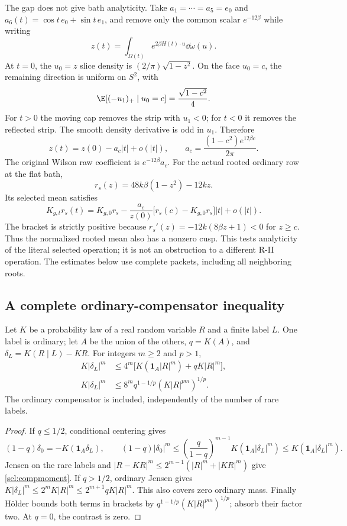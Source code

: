 The gap does not give bath analyticity. Take \(a_1=\cdots=a_5=e_0\) and \(a_6(t)=\cos t\,e_0+\sin t\,e_1\), and remove only the common scalar \(e^{-12\beta}\) while writing
\[
 z(t)=\int_{\Omega(t)}e^{2\beta H(t)\cdot u}\dd\omega(u).
\]
At \(t=0\), the \(u_0=z\) slice density is \((2/\pi)\sqrt{1-z^2}\). On the face \(u_0=c\), the remaining direction is uniform on \(S^2\), with
\[
 \E[(-u_1)_+\mid u_0=c]=\frac{\sqrt{1-c^2}}4.
\]
For \(t>0\) the moving cap removes the strip with \(u_1<0\); for \(t<0\) it removes the reflected strip. The smooth density derivative is odd in \(u_1\). Therefore
\begin{equation}
 z(t)=z(0)-a_c|t|+o(|t|),\qquad
 a_c=\frac{(1-c^2)e^{12\beta c}}{2\pi}.
 \label{sel:cusp}
\end{equation}
The original Wilson raw coefficient is \(e^{-12\beta}a_c\). For the actual rooted ordinary row at the flat bath,
\[
 r_s(z)=48k\beta(1-z^2)-12kz.
\]
Its selected mean satisfies
\begin{equation}
 K_{g,t}r_s(t)=K_{g,0}r_s
 -\frac{a_c}{z(0)}
       \bigl[r_s(c)-K_{g,0}r_s\bigr]|t|+o(|t|).
 \label{sel:meancusp}
\end{equation}
The bracket is strictly positive because \(r_s'(z)=-12k(8\beta z+1)<0\) for \(z\ge c\). Thus the normalized rooted mean also has a nonzero cusp. This tests analyticity of the literal selected operation; it is not an obstruction to a different R-II operation. The estimates below use complete packets, including all neighboring roots.

\subsection{A complete ordinary-compensator inequality}

\begin{lemma}
\label{sel:compensation}
Let \(K\) be a probability law of a real random variable \(R\) and a finite label \(L\). One label is ordinary; let \(A\) be the union of the others, \(q=K(A)\), and \(\delta_L=K(R\mid L)-KR\). For integers \(m\ge2\) and \(p>1\),
\begin{align}
 K|\delta_L|^m
 &\le4^m\bigl[K(\mathbf1_A|R|^m)+qK|R|^m\bigr],
 \label{sel:compmoment}\\
 K|\delta_L|^m
 &\le8^m q^{1-1/p}(K|R|^{pm})^{1/p}.
 \label{sel:holdermoment}
\end{align}
The ordinary compensator is included, independently of the number of rare labels.
\end{lemma}
\begin{proof}
If \(q\le1/2\), conditional centering gives
\[
 (1-q)\delta_0=-K(\mathbf1_A\delta_L),\qquad
 (1-q)|\delta_0|^m
 \le\left(\frac q{1-q}\right)^{m-1}
                 K(\mathbf1_A|\delta_L|^m)
 \le K(\mathbf1_A|\delta_L|^m).
\]
Jensen on the rare labels and \(|R-KR|^m\le2^{m-1}(|R|^m+|KR|^m)\) give \eqref{sel:compmoment}. If \(q>1/2\), ordinary Jensen gives \(K|\delta_L|^m\le2^mK|R|^m\le2^{m+1}qK|R|^m\). This also covers zero ordinary mass. Finally Hölder bounds both terms in brackets by \(q^{1-1/p}(K|R|^{pm})^{1/p}\); absorb their factor two. At \(q=0\), the contrast is zero.
\end{proof}

